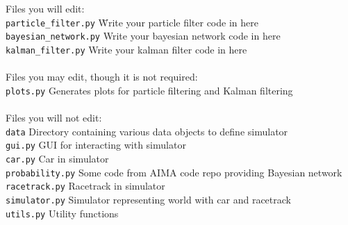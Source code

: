 \documentclass[a4paper]{article}
\theoremstyle{definition}
\theoremstyle{plain}
\begin{document}
\begin{tabbing}
    Files you will edit:\\
    \texttt{particle\_filter.py} \hspace{2em} \= Write your particle filter code in here \\
    \texttt{bayesian\_network.py} \> Write your bayesian network code in here\\
    \texttt{kalman\_filter.py} \> Write your kalman filter code in here\\\\
    
    Files you may edit, though it is not required:\\
    \texttt{plots.py} \> Generates plots for particle filtering and Kalman filtering\\\\
    
    Files you will not edit:\\
    \texttt{data} \> Directory containing various data objects to define simulator \\
    \texttt{gui.py} \> GUI for interacting with simulator\\
    \texttt{car.py} \> Car in simulator\\
    \texttt{probability.py} \> Some code from AIMA code repo providing Bayesian network\\
    \texttt{racetrack.py} \> Racetrack in simulator\\
    \texttt{simulator.py} \> Simulator representing world with car and racetrack\\
    \texttt{utils.py} \> Utility functions
\end{tabbing}
\end{document}
